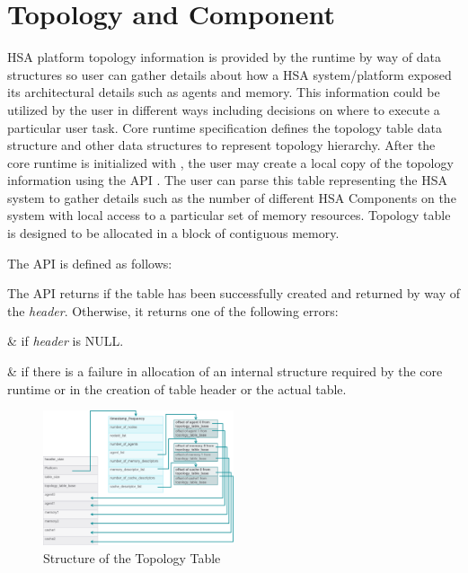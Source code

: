 \hypertarget{component}{}\section{Topology and Component
}\label{topology}
HSA platform topology information is provided by the runtime by way of
data structures so user can gather details about how a HSA
system/platform exposed its architectural details such as
agents and memory. This information
could be utilized by the user in different ways including decisions
on where to execute a particular user task. Core runtime
specification defines the topology table data structure and other
data structures to represent topology hierarchy.  After the core
runtime is initialized with , the user may create a
local copy of the topology information using the API
. The user can parse this table
representing the HSA system to gather details such as the number of
different HSA Components on the system with local access to a
particular set of memory resources. Topology table is designed to be
allocated in a block of contiguous memory.

The  API is defined as follows:



The API returns  if the table has been
successfully created and returned by way of the {\itshape header}. Otherwise,
it returns one of the following errors:

\begin{easylist}
&  if {\itshape header}
is NULL.

&  if there is a failure
in allocation of an internal structure required by the core runtime
or in the creation of table header or the actual table.
\end{easylist}

\begin{figure}
  \centering
  \includegraphics[width=0.5\textwidth]{topologytable}
  \centering
  \caption{Structure of the Topology Table}
  \label{fig:topology_table}
\end{figure}

